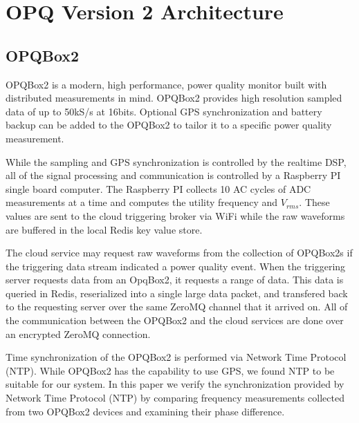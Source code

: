\documentclass[a4paper, conference]{IEEEtran}
\begin{document}

\section{OPQ Version 2 Architecture}
\subsection{OPQBox2}
OPQBox2 is a modern, high performance, power quality monitor built with distributed measurements in mind. OPQBox2 provides high resolution sampled data of up to 50kS/s at 16bits. Optional GPS synchronization and battery backup can be added to the OPQBox2 to tailor it to a specific power quality measurement. 

While the sampling and GPS synchronization is controlled by the realtime DSP, all of the signal processing and communication is controlled by a Raspberry PI single board computer. The Raspberry PI collects 10 AC cycles of ADC measurements at a time and computes the utility frequency and $V_{rms}$. These values are sent to the cloud triggering broker via WiFi while the raw waveforms are buffered in the local Redis key value store.

The cloud service may request raw waveforms from the collection of OPQBox2s if the triggering data stream indicated a power quality event. When the triggering server requests data from an OpqBox2, it requests a range of data. This data is queried in Redis, reserialized into a single large data packet, and transfered back to the requesting server over the same ZeroMQ channel that it arrived on. All of the communication between the OPQBox2 and the cloud services are done over an encrypted ZeroMQ connection.

Time synchronization of the OPQBox2 is performed via Network Time Protocol (NTP). While OPQBox2 has the capability to use GPS, we found NTP to be suitable for our system.
In this paper we verify the synchronization provided by Network Time Protocol (NTP) by comparing frequency measurements collected from two OPQBox2 devices and examining their phase difference. 
\end{document}
